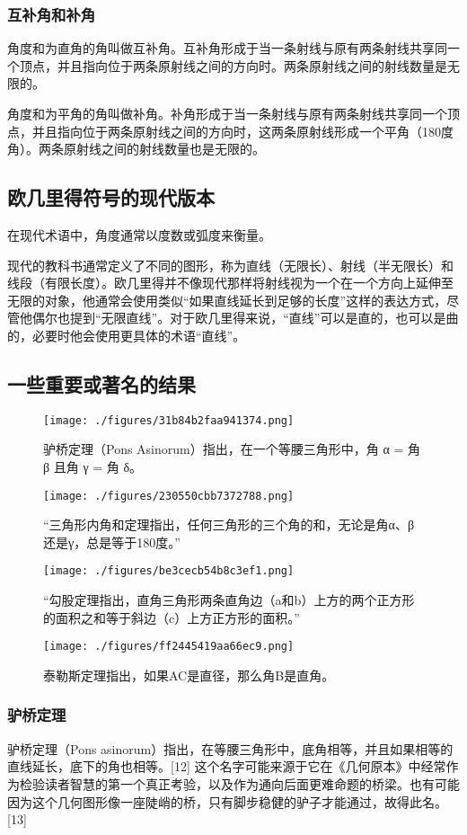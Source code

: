 \subsubsection{互补角和补角}  
角度和为直角的角叫做互补角。互补角形成于当一条射线与原有两条射线共享同一个顶点，并且指向位于两条原射线之间的方向时。两条原射线之间的射线数量是无限的。

角度和为平角的角叫做补角。补角形成于当一条射线与原有两条射线共享同一个顶点，并且指向位于两条原射线之间的方向时，这两条原射线形成一个平角（180度角）。两条原射线之间的射线数量也是无限的。
\subsection{欧几里得符号的现代版本}  
在现代术语中，角度通常以度数或弧度来衡量。

现代的教科书通常定义了不同的图形，称为直线（无限长）、射线（半无限长）和线段（有限长度）。欧几里得并不像现代那样将射线视为一个在一个方向上延伸至无限的对象，他通常会使用类似“如果直线延长到足够的长度”这样的表达方式，尽管他偶尔也提到“无限直线”。对于欧几里得来说，“直线”可以是直的，也可以是曲的，必要时他会使用更具体的术语“直线”。
\subsection{一些重要或著名的结果}
\begin{figure}[ht]
\centering
\texttt{[image: ./figures/31b84b2faa941374.png]}
\caption{驴桥定理（Pons Asinorum）指出，在一个等腰三角形中，角 α = 角 β 且角 γ = 角 δ。} \label{fig_OJLJH_4}
\end{figure}
\begin{figure}[ht]
\centering
\texttt{[image: ./figures/230550cbb7372788.png]}
\caption{“三角形内角和定理指出，任何三角形的三个角的和，无论是角α、β还是γ，总是等于180度。”} \label{fig_OJLJH_5}
\end{figure}
\begin{figure}[ht]
\centering
\texttt{[image: ./figures/be3cecb54b8c3ef1.png]}
\caption{“勾股定理指出，直角三角形两条直角边（a和b）上方的两个正方形的面积之和等于斜边（c）上方正方形的面积。”} \label{fig_OJLJH_6}
\end{figure}
\begin{figure}[ht]
\centering
\texttt{[image: ./figures/ff2445419aa66ec9.png]}
\caption{泰勒斯定理指出，如果AC是直径，那么角B是直角。} \label{fig_OJLJH_7}
\end{figure}
\subsubsection{驴桥定理}  
驴桥定理（Pons asinorum）指出，在等腰三角形中，底角相等，并且如果相等的直线延长，底下的角也相等。[12] 这个名字可能来源于它在《几何原本》中经常作为检验读者智慧的第一个真正考验，以及作为通向后面更难命题的桥梁。也有可能因为这个几何图形像一座陡峭的桥，只有脚步稳健的驴子才能通过，故得此名。[13]
